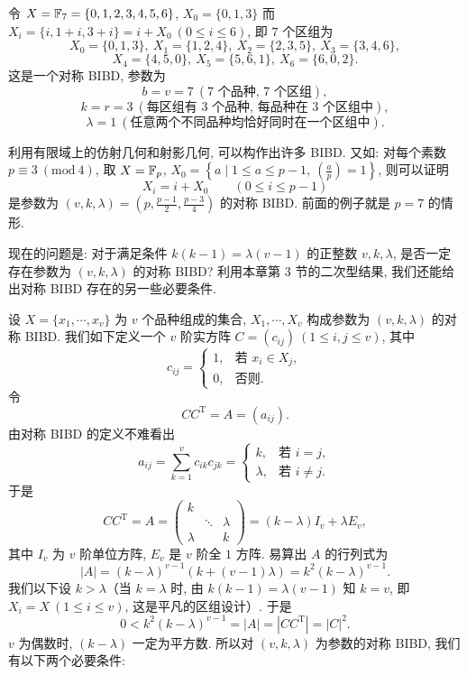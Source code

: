 \begin{example}
令 $X=\mathbb{F}_7=\{0,1,2,3,4,5,6\}$, $X_0=\{0,1,3\}$ 而 $X_i=\{i,1+i,3+i\}=i+X_0\ (0\leqslant i\leqslant 6)$, 即 $7$ 个区组为
\[
  X_0=\{0,1,3\},\ X_1=\{1,2,4\},\ X_2=\{2,3,5\},\ X_3=\{3,4,6\},
\]
\[
  X_4=\{4,5,0\},\ X_5=\{5,6,1\},\ X_6=\{6,0,2\}.
\]
这是一个对称 BIBD, 参数为
\[
  b=v=7\ (\text{7 个品种, 7 个区组}),
\]
\[
  k=r=3\ (\text{每区组有 3 个品种, 每品种在 3 个区组中}),
\]
\[
  \lambda=1\ (\text{任意两个不同品种均恰好同时在一个区组中}).
\]
\end{example}

利用有限域上的仿射几何和射影几何, 可以构作出许多 BIBD. 又如: 对每个素数 $p\equiv 3\ (\mathrm{mod}\ 4)$, 取 $X=\mathbb{F}_p$, $X_0=\left\{a\mid 1\leqslant a\leqslant p-1,\ \left(\frac{a}{p}\right)=1\right\}$, 则可以证明
\[
  X_i=i+X_0\qquad(0\leqslant i\leqslant p-1)
\]
是参数为 $(v,k,\lambda)=\left(p,\frac{p-1}{2},\frac{p-3}{4}\right)$ 的对称 BIBD. 前面的例子就是 $p=7$ 的情形.

现在的问题是: 对于满足条件 $k(k-1)=\lambda(v-1)$ 的正整数 $v,k,\lambda$, 是否一定存在参数为 $(v,k,\lambda)$ 的对称 BIBD? 利用本章第 $3$ 节的二次型结果, 我们还能给出对称 BIBD 存在的另一些必要条件.

设 $X=\{x_1,\cdots,x_v\}$ 为 $v$ 个品种组成的集合, $X_1,\cdots,X_v$ 构成参数为 $(v,k,\lambda)$ 的对称 BIBD. 我们如下定义一个 $v$ 阶实方阵 $C=(c_{ij})\ (1\leqslant i,j\leqslant v)$, 其中
\[
  c_{ij}=\begin{cases}
    1, & \text{若 } x_i\in X_j,\\
    0, & \text{否则}.
  \end{cases}
\]
令
\[
  CC^{\mathrm{T}}=A=(a_{ij}).
\]
由对称 BIBD 的定义不难看出
\[
  a_{ij}=\sum_{k=1}^{v}c_{ik}c_{jk}=\begin{cases}
    k, & \text{若 } i=j,\\
    \lambda, & \text{若 } i\neq j.
  \end{cases}
\]
于是
\[
  CC^{\mathrm{T}}=A=
  \left(\begin{array}{ccc}k& &\\ & \ddots & \lambda\\ \lambda & & k\end{array}\right)
  =(k-\lambda)I_v+\lambda E_v,
\]
其中 $I_v$ 为 $v$ 阶单位方阵, $E_v$ 是 $v$ 阶全 $1$ 方阵. 易算出 $A$ 的行列式为
\[
  |A|=(k-\lambda)^{v-1}(k+(v-1)\lambda)=k^2(k-\lambda)^{v-1}.
\]
我们以下设 $k>\lambda$（当 $k=\lambda$ 时, 由 $k(k-1)=\lambda(v-1)$ 知 $k=v$, 即 $X_i=X\ (1\leqslant i\leqslant v)$, 这是平凡的区组设计）. 于是
\[
  0<k^2(k-\lambda)^{v-1}=|A|=|CC^{\mathrm{T}}|=|C|^2.
\]
$v$ 为偶数时, $(k-\lambda)$ 一定为平方数. 所以对 $(v,k,\lambda)$ 为参数的对称 BIBD, 我们有以下两个必要条件:

